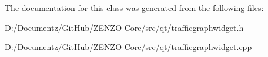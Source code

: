 The documentation for this class was generated from the following files\+:\begin{DoxyCompactItemize}
\item 
D\+:/\+Documentz/\+Git\+Hub/\+Z\+E\+N\+Z\+O-\/\+Core/src/qt/trafficgraphwidget.\+h\item 
D\+:/\+Documentz/\+Git\+Hub/\+Z\+E\+N\+Z\+O-\/\+Core/src/qt/trafficgraphwidget.\+cpp\end{DoxyCompactItemize}
